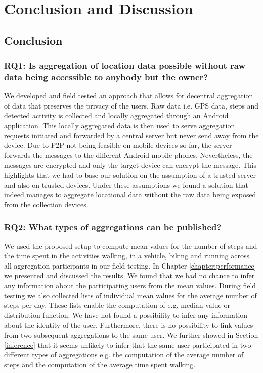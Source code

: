 \chapter{Conclusion and Discussion}\label{chapter:conclusion}
\section{Conclusion}

\subsection*{RQ1: Is aggregation of location data possible without raw data being accessible to anybody but the owner?}
We developed and field tested an approach that allows for decentral aggregation of data that preserves the privacy of the users. Raw data i.e. GPS data, steps and detected activity is collected and locally aggregated through an Android application. This locally aggregated data is then used to serve aggregation requests initiated and forwarded by a central server but never send away from the device. Due to P2P not being feasible on mobile devices so far, the server forwards the messages to the different Android mobile phones. Nevertheless, the messages are encrypted and only the target device can encrypt the message. This highlights that we had to base our solution on the assumption of a trusted server and also on trusted devices. Under these assumptions we found a solution that indeed manages to aggregate locational data without the raw data being exposed from the collection devices.

\subsection*{RQ2: What types of aggregations can be published?}
We used the proposed setup to compute mean values for the number of steps and the time spent in the activities walking, in a vehicle, biking and running across all aggregation participants in our field testing. In Chapter \ref{chapter:performance} we presented and discussed the results. We found that we had no chance to infer any information about the participating users from the mean values. During field testing we also collected lists of individual mean values for the average number of steps per day. These lists enable the computation of e.g. median value or distribution function. We have not found a possibility to infer any information about the identity of the user. Furthermore, there is no possibility to link values from two subsequent aggregations to the same user. We further showed in Section \ref{inference} that it seems unlikely to infer that the same user participated in two different types of aggregations e.g. the computation of the average number of steps and the computation of the average time spent walking.

